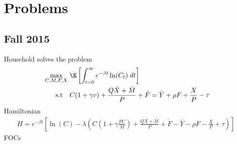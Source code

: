 \documentclass[12pt]{article}
\theoremstyle{plain}
\theoremstyle{definition}
\theoremstyle{remark}
\begin{document}
\clearpage
\section{Problems}

\subsection{Fall 2015}

Household solves the problem
\begin{align*}
  \max_{C,M,F,X}
  \; &
  \E\left[
    \int_{t=0}^\infty
    e^{-\beta t}\ln(C_t)\;dt
  \right]
  \\
  \qquad \text{s.t}\quad
  &
  C (1+\gamma v) + \frac{Q\dot{X}+\dot{M}}{P}
  + \dot{F}
  = \bar{Y} + \rho F + \frac{X}{P} - \tau
\end{align*}
Hamiltonian
\begin{align*}
  H
  =
  e^{-\beta t}
  \left[
    \ln(C)
    -
    \lambda
    \left(
      C \left(1+\gamma \frac{PC}{M}\right) + \frac{Q\dot{X}+\dot{M}}{P}
      + \dot{F}
      - \bar{Y} - \rho F - \frac{X}{P} + \tau
    \right)
  \right]
\end{align*}
FOCs
\end{document}
